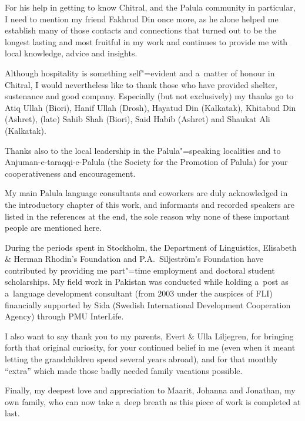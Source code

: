 \begin{refsection}
For his help in getting to know Chitral, and the Palula community in particular, I need to mention
my friend Fakhrud Din once more, as he alone helped me establish many of those contacts and
connections that turned out to be the longest lasting and most fruitful in my work and continues to
provide me with local knowledge, advice and insights.


Although hospitality is something self"=evident and a~matter of honour in Chitral, I would
nevertheless like to thank those who have provided shelter, sustenance and good company. Especially
(but not exclusively) my thanks go to Atiq Ullah (Biori), Hanif Ullah (Drosh), Hayatud Din
(Kalkatak), Khitabud Din (Ashret), (late) Sahib Shah (Biori), Said Habib (Ashret) and Shaukat Ali
(Kalkatak).


Thanks also to the local leadership in the Palula"=speaking localities and to
Anjuman-e-taraqqi-e-Palula (the Society for the Promotion of Palula) for your cooperativeness and
encouragement.


My main Palula language consultants and coworkers are duly acknowledged in the introductory chapter
of this work, and informants and recorded speakers are listed in the references at the end, the sole
reason why none of these important people are mentioned here.


During the periods spent in Stockholm, the Department of Linguistics, Elisabeth \& Herman Rhodin's
Foundation and P.A.~Siljeström's Foundation have contributed by providing me part"=time employment
and doctoral student scholarships. My field work in Pakistan was conducted while holding a~post as
a~language development consultant (from 2003 under the auspices of FLI) financially supported by
Sida (Swedish International Development Cooperation Agency) through PMU InterLife.


I also want to say thank you to my parents, Evert \& Ulla Liljegren, for bringing forth that
original curiosity, for your continued belief in me (even when it meant letting the grandchildren
spend several years abroad), and for that monthly ``extra'' which made those badly needed family
vacations possible.


Finally, my deepest love and appreciation to Maarit, Johanna and Jonathan, my own family, who can
now take a~deep breath as this piece of work is completed at last.

\printbibliography[heading=subbibliography]
\end{refsection}
